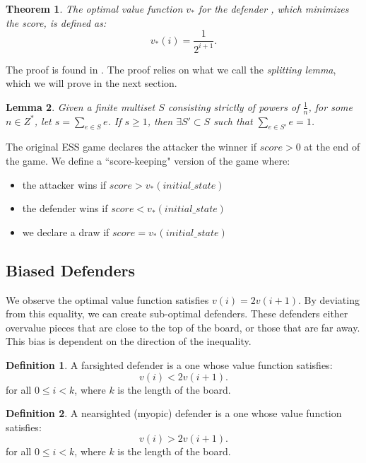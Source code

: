 \documentclass{article}
\theoremstyle{plain}
\newtheorem{thm}{Theorem}[section]
\newtheorem{lem}[thm]{Lemma}
\theoremstyle{definition}
\newtheorem{defn}{Definition}[section]
\theoremstyle{remark}
\begin{document}
\begin{thm}
	The optimal value function $v_{*}$ for the defender , which minimizes the score, is defined as:
	\begin{equation}
		v_{*}(i) = \frac{1}{2^{i+1}}.
	\end{equation}
\end{thm}

The proof is found in \cite{original}. The proof relies on what we call the \textit{splitting lemma}, which we will prove in the next section.

\begin{lem}
	Given a finite multiset $S$ consisting strictly of powers of $\frac{1}{n}$, for some $n \in Z^*$, let $s = \sum_{e \in S} e$. If $s \ge 1$, then $\exists S' \subset S$ such that $ \sum_{e \in S'} e  = 1$.
\end{lem}

The original ESS game declares the attacker the winner if $score > 0$ at the end of the game. We define a ``score-keeping" version of the game where:
\begin{itemize}
	\item the attacker wins if $score > v_*(initial\_state)$
	\item the defender wins if $score < v_*(initial\_state)$
	\item we declare a draw if $score = v_*(initial\_state)$
\end{itemize}

\subsection{Biased Defenders} 

We observe the optimal value function satisfies $v(i) = 2v(i+1)$. By deviating from this equality, we can create sub-optimal defenders. These defenders either overvalue pieces that are close to the top of the board, or those that are far away. This bias is dependent on the direction of the inequality.

\begin{defn}
	A farsighted defender is a one whose value function satisfies:
	\begin{equation}
		v(i) < 2v(i+1).
	\end{equation}
	for all $0 \le i < k$, where $k$ is the length of the board.
\end{defn}

\begin{defn}
	A nearsighted (myopic) defender is a one whose value function satisfies:
	\begin{equation}
		v(i) > 2v(i+1).
	\end{equation}
	for all $0 \le i < k$, where $k$ is the length of the board.
\end{defn}
\end{document}
